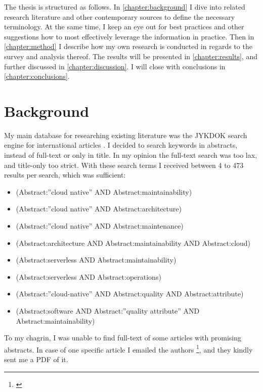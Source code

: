\documentclass[utf8,english]{gradu3}
\begin{document}
The thesis is structured as follows. In \autoref{chapter:background} I dive
into related research literature and other contemporary sources to define the
necessary terminology. At the same time, I keep an eye out for best practices
and other suggestions how to most effectively leverage the information in practice.
Then in \autoref{chapter:method} I describe how my own research is
conducted in regards to the survey and analysis thereof.
The results will be presented in \autoref{chapter:results}, and further
discussed in \autoref{chapter:discussion}. I will close with conclusions in
\autoref{chapter:conclusions}.


\chapter{Background}
\label{chapter:background}

My main database for researching existing literature was the JYKDOK search engine for international articles \parencite{JYKDOK}.
I decided to search keywords in abstracts, instead of full-text or only in title.
In my opinion the full-text search was too lax, and title-only too strict.
With these search terms I received between 4 to 473 results per search, which was sufficient:
\begin{itemize}
  \item (Abstract:''cloud native'' AND Abstract:maintainability)
  \item (Abstract:''cloud native'' AND Abstract:architecture)
  \item (Abstract:''cloud native'' AND Abstract:maintenance)
  \item (Abstract:architecture AND Abstract:maintainability AND Abstract:cloud)
  \item (Abstract:serverless AND Abstract:maintainability)
  \item (Abstract:serverless AND Abstract:operations)
  \item (Abstract:''cloud-native'' AND Abstract:quality AND Abstract:attribute)
  \item (Abstract:software AND Abstract:''quality attribute'' AND Abstract:maintainability)
\end{itemize}

To my chagrin, I was unable to find full-text of some articles with promising abstracts.
In case of one specific article I emailed the authors \footnote{\textcite{Bogner2018}}, and they kindly sent me a PDF of it.
\end{document}
